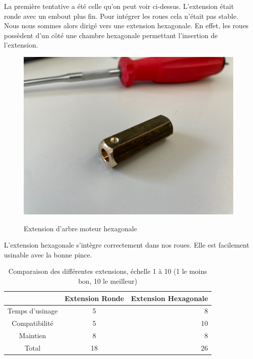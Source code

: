 \documentclass[
	a4paper,									%
	11pt,										%
	twoside,									%
	openright,									%
	notitlepage,									%
	parskip=half,								%
]{scrreprt}										%
\begin{document}
La première tentative a été celle qu'on peut voir ci-dessus. L'extension était ronde avec un embout 
plus fin. Pour intégrer les roues cela n'était pas stable. Nous nous sommes alors dirigé vers une extension
hexagonale. En effet, les roues possèdent d'un côté une chambre hexagonale permettant l'insertion de l'extension. \par

\begin{figure}[!h]
	\centering 
	\includegraphics[scale=.1]{img/ExtensionArbreMoteurHexa.jpg}
	\label{ExtensionHexa}
	\caption{Extension d'arbre moteur hexagonale}	
\end{figure}

\newpage
L'extension hexagonale s'intègre correctement dans nos roues. Elle est facilement usinable avec la bonne pince. \par

\begin{table}[!ht]
    \begin{center}
        \vspace{5mm}
        \label{tab:table2}
        \begin{tabular}{c|c|r} %
            \toprule
            \textbf{ } & \textbf{Extension Ronde} & \textbf{Extension Hexagonale}\\
            \midrule
            Temps d'usinage & 5 & 8\\
            Compatibilité & 5 & 10\\
            Maintien & 8 & 8 \\
			\midrule
			Total & 18 & 26\\
            \bottomrule
        \end{tabular}
    \end{center}    
	\caption{Comparaison des différentes extensions, échelle 1 à 10 (1 le moins bon, 10 le meilleur)}
\end{table}
\end{document}
